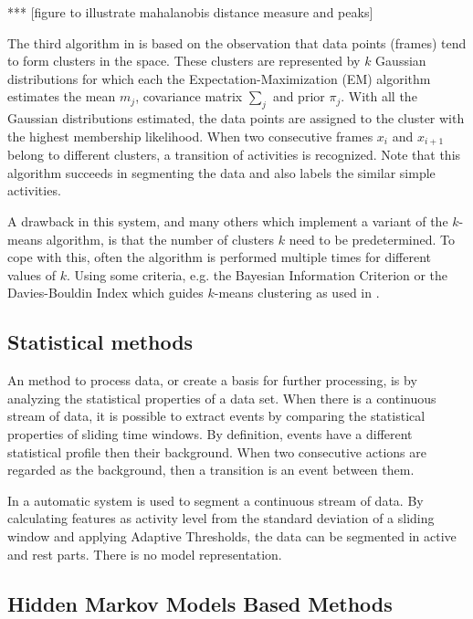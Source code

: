 *** [figure to illustrate mahalanobis distance measure and peaks]

The third algorithm in \cite{barbivc2004segmenting} is based on the
observation that data points (frames) tend to form clusters in the space.
These clusters are represented by $k$ Gaussian distributions for which each
the Expectation-Maximization (EM) algorithm estimates the mean $m_j$,
covariance matrix $\sum_{j}$ and prior $\pi_j$. With all the Gaussian
distributions estimated, the data points are assigned to the cluster with the
highest membership likelihood. When two consecutive frames $x_i$ and $x_{i+1}$
belong to different clusters, a transition of activities is recognized. Note
that this algorithm succeeds in segmenting the data and also labels the
similar simple activities.

A drawback in this system, and many others which implement a variant of the
$k$-means algorithm, is that the number of clusters $k$ need to be
predetermined. To cope with this, often the algorithm is performed multiple
times for different values of $k$. Using some criteria, e.g. the Bayesian
Information Criterion \cite{pelleg2000x} or the Davies-Bouldin Index which
guides $k$-means clustering as used in \cite{krause2003unsupervised}.

\subsection{Statistical methods}
An method to process data, or create a basis for further processing, is by
analyzing the statistical properties of a data set. When there is a continuous
stream of data, it is possible to extract events by comparing the statistical
properties of sliding time windows. By definition, events have a different
statistical profile then their background. When two consecutive actions are
regarded as the background, then a transition is an event between them.

In \cite{guenterberg2009automatic} a automatic system is used to segment a
continuous stream of data. By calculating features as activity level from the
standard deviation of a sliding window and applying Adaptive Thresholds, the
data can be segmented in active and rest parts. There is no model
representation.

\subsection{Hidden Markov Models Based Methods}

